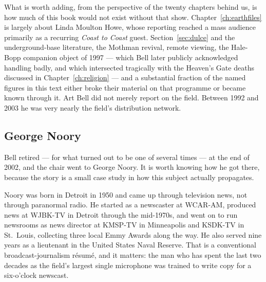 What is worth adding, from the perspective of the twenty chapters behind us, is how much of this book
would not exist without that show. Chapter~\ref{ch:earthfiles} is largely about Linda Moulton Howe,
whose reporting reached a mass audience primarily as a recurring \emph{Coast to Coast} guest.
Section~\ref{sec:dulce} and the underground-base literature, the Mothman revival, remote viewing, the
Hale-Bopp companion object of 1997 --- which Bell later publicly acknowledged handling badly, and
which intersected tragically with the Heaven's Gate deaths discussed in
Chapter~\ref{ch:religion} --- and a substantial fraction of the named figures in this text either
broke their material on that programme or became known through it. Art Bell did not merely report on
the field. Between 1992 and 2003 he was very nearly the field's distribution network.

\subsection{George Noory}



Bell retired --- for what turned out to be one of several times --- at the end of 2002, and the chair
went to George Noory. It is worth knowing how he got there, because the story is a small case study in
how this subject actually propagates.

Noory was born in Detroit in 1950 and came up through television news, not through paranormal radio. He
started as a newscaster at WCAR-AM, produced news at WJBK-TV in Detroit through the mid-1970s, and went
on to run newsrooms as news director at KMSP-TV in Minneapolis and KSDK-TV in St.\ Louis, collecting
three local Emmy Awards along the way. He also served nine years as a lieutenant in the United States
Naval Reserve. That is a conventional broadcast-journalism résumé, and it matters: the man who has
spent the last two decades as the field's largest single microphone was trained to write copy for a
six-o'clock newscast.

